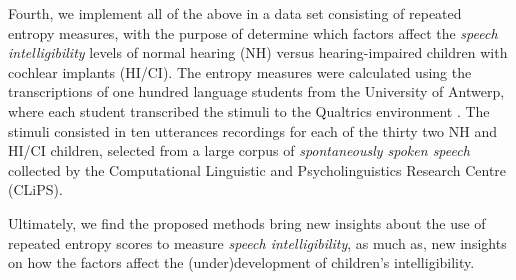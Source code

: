 Fourth, we implement all of the above in a data set consisting of repeated entropy measures, with the purpose of determine which factors affect the \textit{speech intelligibility} levels of normal hearing (NH) versus hearing-impaired children with cochlear implants (HI/CI). The entropy measures were calculated using the transcriptions of one hundred language students from the University of Antwerp, where each student transcribed the stimuli to the Qualtrics environment \cite{Qualtrics_2005}. The stimuli consisted in ten utterances recordings for each of the thirty two NH and HI/CI children, selected from a large corpus of \textit{spontaneously spoken speech} collected by the Computational Linguistic and Psycholinguistics Research Centre (CLiPS).

Ultimately, we find the proposed methods bring new insights about the use of repeated entropy scores to measure \textit{speech intelligibility}, as much as, new insights on how the factors affect the (under)development of children's intelligibility.
%
%
